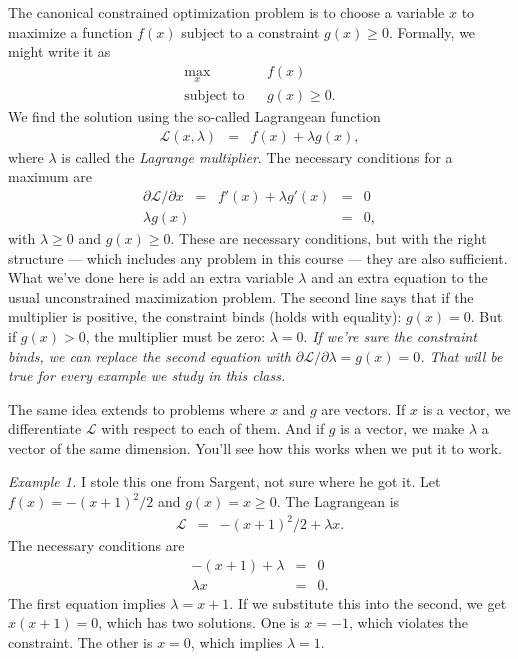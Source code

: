 \documentclass[11pt]{article}
\begin{document}
The canonical constrained optimization problem
is to choose a variable $x$ to maximize a function
$f(x)$ subject to a constraint $g(x) \geq 0$.
Formally, we might write it as
\begin{eqnarray*}
    \max_x && f(x) \\
    \mbox{subject to} && g(x) \geq 0 .
\end{eqnarray*}
We find the solution using the so-called Lagrangean function
\begin{eqnarray*}
    \mathcal{L}(x,\lambda) &=& f(x) + \lambda g(x) ,
\end{eqnarray*}
where $\lambda$ is called the {\it Lagrange multiplier\/}.
The necessary conditions for a maximum are
\begin{eqnarray*}
   \partial \mathcal{L}/\partial x \;\;=\;\; f'(x) + \lambda g'(x) &=&  0 \\
   \lambda g(x) &=& 0 ,
\end{eqnarray*}
with  $\lambda \geq 0$ and $g(x) \geq 0$.
These are necessary conditions,
but with the right structure --- which includes any problem in this course ---
they are also sufficient.
What we've done here is add an extra variable $\lambda$
and an extra equation to the usual unconstrained maximization problem.
The second line says that if the multiplier is positive,
the constraint binds (holds with equality):  $g(x) = 0$.
But if $g(x) > 0$, the multiplier must be zero:  $\lambda = 0$.
{\it If we're sure the constraint binds, we can replace the second equation
with $ \partial \mathcal{L}/\partial \lambda = g(x) = 0$.
That will be true for every example we study in this class.\/}

The same idea extends to problems where $x$ and $g$
are vectors.
If $x$ is a vector, we differentiate $\mathcal{L}$ with
respect to each of them.
And if $g$ is a vector, we make $\lambda$ a vector of the same
dimension.
You'll see how this works when we put it to work.


{\it Example 1.\/}
I stole this one from Sargent, not sure where he got it.
Let $f(x) =- (x+1)^2/2$  and $g(x) = x \geq 0$.
The Lagrangean is
\begin{eqnarray*}
    \mathcal{L} &=& - (x+1)^2/2 + \lambda x .
\end{eqnarray*}
The necessary conditions are
\begin{eqnarray*}
    -(x+1) + \lambda &=& 0 \\
    \lambda x &=& 0.
\end{eqnarray*}
The first equation implies $\lambda = x + 1$.
If we substitute this into the second, we get $x(x+1) = 0$,
which has two solutions.
One is $x=-1$, which violates the constraint.
The other is $x=0$, which implies $\lambda = 1$.
\end{document}
